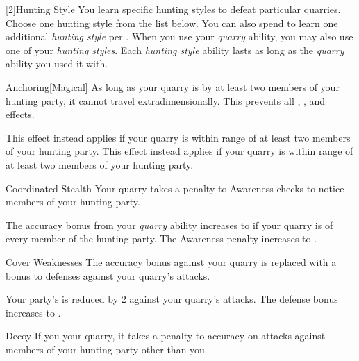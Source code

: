         [2]{Hunting Style}
        You learn specific hunting styles to defeat particular quarries.
        Choose one hunting style from the list below.
        You can also spend  to learn one additional \textit{hunting style} per .
        When you use your \textit{quarry} ability, you may also use one of your \textit{hunting styles}.
        Each \textit{hunting style} ability lasts as long as the \textit{quarry} ability you used it with.
        {
            \begin{freeability}{Anchoring}[Magical]
                As long as your quarry is  by at least two members of your hunting party, it cannot travel extradimensionally.
                This prevents all , , and  effects.

                \rankline
                 This effect instead applies if your quarry is within \rngmed range of at least two members of your hunting party.
                 This effect instead applies if your quarry is within \rnglong range of at least two members of your hunting party.
            \end{freeability}

            \begin{freeability}{Coordinated Stealth}
                Your quarry takes a  penalty to Awareness checks to notice members of your hunting party.

                \rankline
                 The accuracy bonus from your \textit{quarry} ability increases to  if your quarry is \unaware of every member of the hunting party.
                 The Awareness penalty increases to .
            \end{freeability}

            \begin{freeability}{Cover Weaknesses}
                The accuracy bonus against your quarry is replaced with a  bonus to defenses against your quarry's attacks.

                \rankline
                 Your party's  is reduced by 2 against your quarry's attacks.
                 The defense bonus increases to .
            \end{freeability}

            \begin{freeability}{Decoy}
                If you  your quarry, it takes a  penalty to accuracy on attacks against members of your hunting party other than you.


\end{freeability}}
